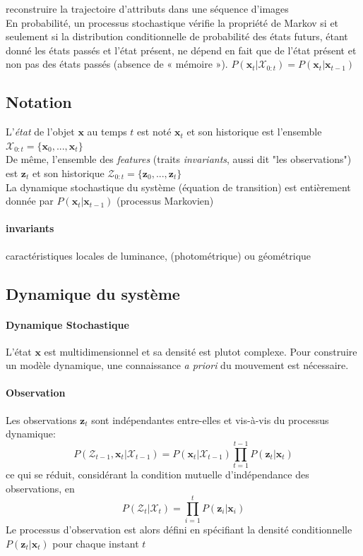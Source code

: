 \documentclass[a4paper,12pt]{report}
\begin{document}
reconstruire la trajectoire d'attributs dans une séquence d'images \\
En probabilité, un processus stochastique vérifie la propriété de Markov si et seulement si la distribution conditionnelle de probabilité des états futurs, étant donné les états passés et l'état présent, ne dépend en fait que de l'état présent et non pas des états passés (absence de « mémoire »).
$P(\mathbf{x}_{t}|\mathcal{X}_{0:t})=P(\mathbf{x}_t|\mathbf{x}_{t-1})$
\subsection{Notation}
L'\textit{état} de l'objet $\mathbf{x}$ au temps $t$ est noté $\mathbf{x}_t$ et son historique est l'ensemble $\mathcal{X}_{0:t} = \{\mathbf{x}_0,...,\mathbf{x}_t\}$\\ 
De m\^eme, l'ensemble des \textit{features} (traits \textit{invariants}, aussi dit "les observations") est $\mathbf{z}_t$ et son historique $ \mathcal{Z}_{0:t}=\{\mathbf{z}_0,...,\mathbf{z}_t\}$\\
La dynamique stochastique du système (équation de transition) est entièrement donnée par $P(\mathbf{x}_t|\mathbf{x}_{t-1})$ (processus Markovien)
\paragraph{invariants}
caractéristiques locales de luminance, (photométrique) ou géométrique
\subsection{Dynamique du système}
\paragraph{Dynamique Stochastique}
L'état $\mathbf{x}$ est multidimensionnel et sa densité est plutot complexe.
Pour construire un  modèle dynamique, une connaissance \textit{a priori} du mouvement est nécessaire.
\paragraph{Observation}
Les observations $\mathbf{z}_t$ sont indépendantes entre-elles et vis-à-vis du processus dynamique:
$$P(\mathcal{Z}_{t-1},\mathbf{x}_t|\mathcal{X}_{t-1}) = P(\mathbf{x}_t|\mathcal{X}_{t-1})\prod_{t=1}^{t-1} P(\mathbf{z}_t|\mathbf{x}_t)$$
ce qui se réduit, considérant la condition mutuelle d'indépendance des observations, en
$$P(\mathcal{Z}_{t}|\mathcal{X}_{t}) = \prod_{i=1}^{t} P(\mathbf{z}_i|\mathbf{x}_i)$$
Le processus d'observation est alors défini en spécifiant la densité conditionnelle $P(\mathbf{z}_t|\mathbf{x}_t)$ pour chaque instant $t$
\end{document}
